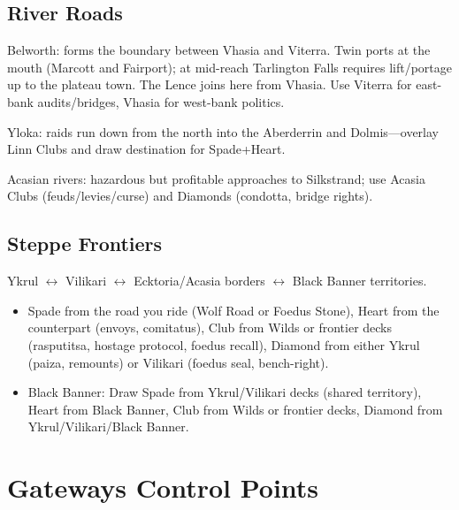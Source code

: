 \documentclass[11pt,letterpaper,twoside]{book}
\begin{document}
\subsection{River Roads}
Belworth: forms the boundary between Vhasia and Viterra. Twin ports at the mouth (Marcott and Fairport); at mid-reach Tarlington Falls requires lift/portage up to the plateau town. The Lence joins here from Vhasia. Use Viterra for east-bank audits/bridges, Vhasia for west-bank politics.

Yloka: raids run down from the north into the Aberderrin and Dolmis---overlay Linn Clubs and draw destination for Spade+Heart.

Acasian rivers: hazardous but profitable approaches to Silkstrand; use Acasia Clubs (feuds/levies/curse) and Diamonds (condotta, bridge rights).

\subsection{Steppe Frontiers}
Ykrul $\leftrightarrow$ Vilikari $\leftrightarrow$ Ecktoria/Acasia borders $\leftrightarrow$ Black Banner territories.

\begin{itemize}
\item Spade from the road you ride (Wolf Road or Foedus Stone), Heart from the counterpart (envoys, comitatus), Club from Wilds or frontier decks (rasputitsa, hostage protocol, foedus recall), Diamond from either Ykrul (paiza, remounts) or Vilikari (foedus seal, bench-right).
\item Black Banner: Draw Spade from Ykrul/Vilikari decks (shared territory), Heart from Black Banner, Club from Wilds or frontier decks, Diamond from Ykrul/Vilikari/Black Banner.
\end{itemize}

\section{Gateways Control Points}
\end{document}
